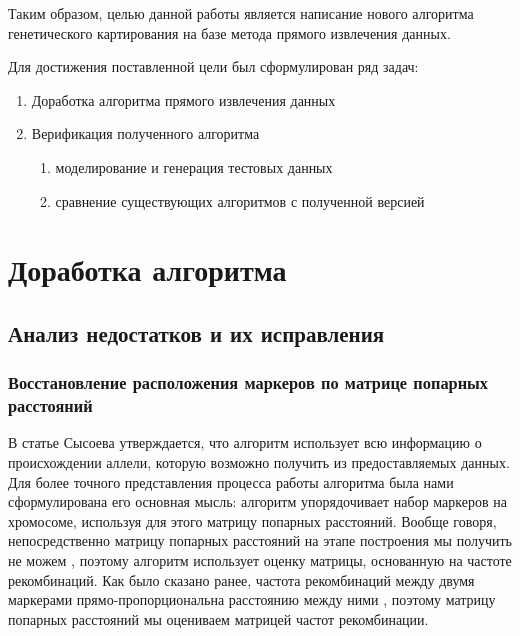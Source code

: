 \documentclass{matmex-diploma-custom}
\begin{document}
Таким образом, целью данной работы является написание нового алгоритма
генетического картирования на базе метода прямого извлечения данных.

\bigskip

Для достижения поставленной цели был сформулирован ряд задач:

\begin{enumerate}
\item Доработка алгоритма прямого извлечения данных
\item Верификация полученного алгоритма
  \begin{enumerate}
  \item моделирование и генерация тестовых
    данных
  \item сравнение существующих алгоритмов с полученной версией
  \end{enumerate}
\end{enumerate}

\section{Доработка алгоритма}

\subsection{Анализ недостатков и их исправления}

\subsubsection{Восстановление расположения маркеров по матрице
  попарных расстояний}

В статье Сысоева \cite{sysoev} утверждается, что алгоритм использует
всю информацию о происхождении аллели, которую возможно получить из
предоставляемых данных. Для более точного представления процесса
работы алгоритма была нами сформулирована его основная мысль: алгоритм
упорядочивает набор маркеров на хромосоме, используя для этого матрицу
попарных расстояний. Вообще говоря, непосредственно матрицу попарных
расстояний на этапе построения мы получить не можем
\cite{bohonak2002ibd}, поэтому алгоритм использует оценку матрицы,
основанную на частоте рекомбинаций. Как было сказано ранее, частота
рекомбинаций между двумя маркерами прямо-пропорциональна расстоянию
между ними \cite{stam1993construction}, поэтому матрицу попарных
расстояний мы оцениваем матрицей частот рекомбинации.
\end{document}
